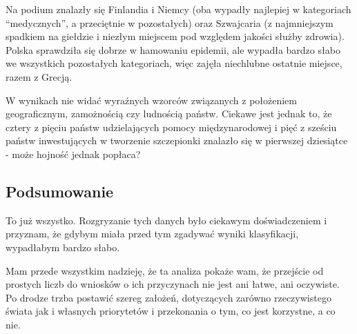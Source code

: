 \documentclass[
]{article}
\begin{document}
Na podium znalazły się Finlandia i Niemcy (oba wypadły najlepiej w
kategoriach ``medycznych'', a przeciętnie w pozostałych) oraz Szwajcaria
(z najmniejszym spadkiem na giełdzie i niezłym miejscem pod względem
jakości służby zdrowia). Polska sprawdziła się dobrze w hamowaniu
epidemii, ale wypadła bardzo słabo we wszystkich pozostałych
kategoriach, więc zajęła niechlubne ostatnie miejsce, razem z Grecją.

W wynikach nie widać wyraźnych wzorców związanych z położeniem
geograficznym, zamożnością czy ludnością państw. Ciekawe jest jednak to,
że cztery z pięciu państw udzielających pomocy międzynarodowej i pięć z
sześciu państw inwestujących w tworzenie szczepionki znalazło się w
pierwszej dziesiątce - może hojność jednak popłaca?

\hypertarget{podsumowanie}{%
\subsection{Podsumowanie}\label{podsumowanie}}

To już wszystko. Rozgryzanie tych danych było ciekawym doświadczeniem i
przyznam, że gdybym miała przed tym zgadywać wyniki klasyfikacji,
wypadłabym bardzo słabo.

Mam przede wszystkim nadzieję, że ta analiza pokaże wam, że przejście od
prostych liczb do wniosków o ich przyczynach nie jest ani łatwe, ani
oczywiste. Po drodze trzba postawić szereg założeń, dotyczących zarówno
rzeczywistego świata jak i własnych priorytetów i przekonania o tym, co
jest korzystne, a co nie.
\end{document}
